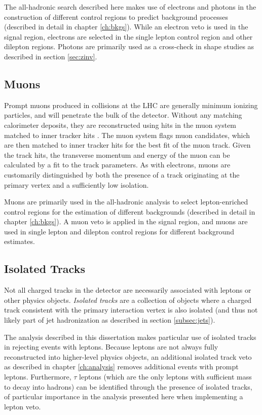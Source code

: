 The all-hadronic search described here makes use of electrons and photons in the construction of different control regions to predict background processes (described in detail in chapter \ref{ch:bkgs}). While an electron veto is used in the signal region, electrons are selected in the single lepton control region and other dilepton regions. Photons are primarily used as a cross-check in \mttwo shape studies as described in section \ref{sec:zinv}.

\subsection{Muons}
\label{subsec:muons}
Prompt muons produced in collisions at the LHC are generally minimum ionizing particles, and will penetrate the bulk of the detector. Without any matching calorimeter deposits, they are reconstructed using hits in the muon system matched to inner tracker hits \cite{Chatrchyan:2009ae}. The muon system flags muon candidates, which are then matched to inner tracker hits for the best fit of the muon track. Given the track hits, the transverse momentum and energy of the muon can be calculated by a fit to the track parameters. As with electrons, muons are customarily distinguished by both the presence of a track originating at the primary vertex and a sufficiently low isolation.

Muons are primarily used in the all-hadronic analysis to select lepton-enriched control regions for the estimation of different backgrounds (described in detail in chapter \ref{ch:bkgs}). A muon veto is applied in the signal region, and muons are used in single lepton and dilepton control regions for different background estimates.

\subsection{Isolated Tracks}
\label{subsec:isotrack}
Not all charged tracks in the detector are necessarily associated with leptons or other physics objects. {\it Isolated tracks} are a collection of objects where a charged track consistent with the primary interaction vertex is also isolated (and thus not likely part of jet hadronization as described in section \ref{subsec:jets}).

The analysis described in this dissertation makes particular use of isolated tracks in rejecting events with leptons. Because leptons are not always fully reconstructed into higher-level physics objects, an additional isolated track veto as described in chapter \ref{ch:analysis} removes additional events with prompt leptons. Furthermore, $\tau$ leptons (which are the only leptons with sufficient mass to decay into hadrons) can be identified through the presence of isolated tracks, of particular importance in the analysis presented here when implementing a lepton veto.

